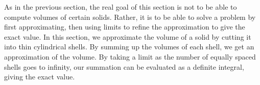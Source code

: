 As in the previous section, the real goal of this section is not to be able to compute volumes of certain solids. Rather, it is to be able to solve a problem by first approximating, then using limits to refine the approximation to give the exact value. In this section, we approximate the volume of a solid by cutting it into thin cylindrical shells. By summing up the volumes of each shell, we get an approximation of the volume. By taking a limit as the number of equally spaced shells goes to infinity, our summation can be evaluated as a definite integral, giving the exact value.


